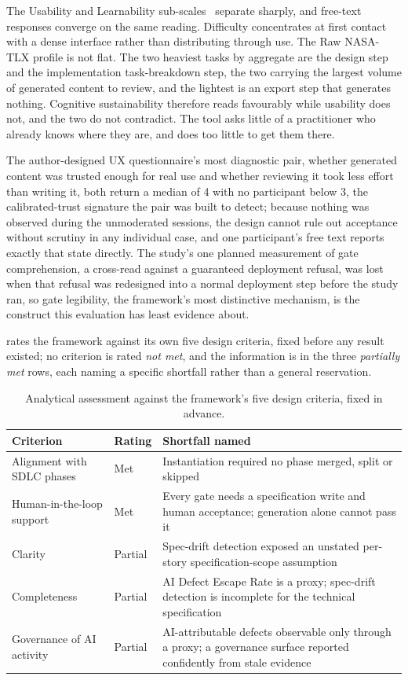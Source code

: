 \documentclass[sigconf,review=false]{acmart}
\begin{document}
The Usability and Learnability sub-scales~\cite{Lewis:2009SUS} separate sharply, and free-text responses converge on the same reading. Difficulty concentrates at first contact with a dense interface rather than distributing through use. The Raw NASA-TLX profile is not flat. The two heaviest tasks by aggregate are the design step and the implementation task-breakdown step, the two carrying the largest volume of generated content to review, and the lightest is an export step that generates nothing. Cognitive sustainability therefore reads favourably while usability does not, and the two do not contradict. The tool asks little of a practitioner who already knows where they are, and does too little to get them there.

The author-designed UX questionnaire's most diagnostic pair, whether generated content was trusted enough for real use and whether reviewing it took less effort than writing it, both return a median of 4 with no participant below 3, the calibrated-trust signature the pair was built to detect; because nothing was observed during the unmoderated sessions, the design cannot rule out acceptance without scrutiny in any individual case, and one participant's free text reports exactly that state directly. The study's one planned measurement of gate comprehension, a cross-read against a guaranteed deployment refusal, was lost when that refusal was redesigned into a normal deployment step before the study ran, so gate legibility, the framework's most distinctive mechanism, is the construct this evaluation has least evidence about.

 rates the framework against its own five design criteria, fixed before any result existed; no criterion is rated \emph{not met}, and the information is in the three \emph{partially met} rows, each naming a specific shortfall rather than a general reservation.

\begin{table}[H]
\centering
\caption{Analytical assessment against the framework's five design criteria, fixed in advance.}
\label{tab:analytical}
\footnotesize
\begin{tabular}{@{}p{2.5cm}p{1.3cm}p{4.0cm}@{}}
\toprule
\textbf{Criterion} & \textbf{Rating} & \textbf{Shortfall named} \\
\midrule
Alignment with SDLC phases & Met & Instantiation required no phase merged, split or skipped \\
Human-in-the-loop support & Met & Every gate needs a specification write and human acceptance; generation alone cannot pass it \\
Clarity & Partial & Spec-drift detection exposed an unstated per-story specification-scope assumption \\
Completeness & Partial & AI Defect Escape Rate is a proxy; spec-drift detection is incomplete for the technical specification \\
Governance of AI activity & Partial & AI-attributable defects observable only through a proxy; a governance surface reported confidently from stale evidence \\
\bottomrule
\end{tabular}
\end{table}
\end{document}

